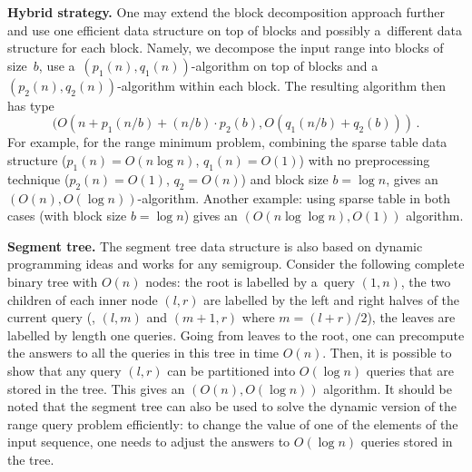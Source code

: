 \textbf{Hybrid strategy.} One may extend the block decomposition
approach further and use one efficient data structure on top of
blocks and possibly a~different data structure for each block.
Namely, we decompose the input range into blocks of size~$b$,
use a~$(p_1(n), q_1(n))$-algorithm on top of blocks and
a~$(p_2(n), q_2(n))$-algorithm within each block. The resulting algorithm then
has type
\[(O(n + p_1(n / b) + (n / b) \cdot p_2(b), O(q_1(n/b) + q_2(b))) \, .\]
For example, for the range minimum problem, combining the sparse table data
structure ($p_1(n)=O(n\log n)$, $q_1(n)=O(1)$) with no preprocessing technique
($p_2(n)=O(1)$, $q_2=O(n)$) and block size $b=\log n$, gives
an~$(O(n), O(\log n))$-algorithm. Another example: using sparse table in both
cases (with block size $b=\log n$) gives an $(O(n\log\log n), O(1))$ algorithm.

%

\textbf{Segment tree.} The segment tree data structure is also based on dynamic
programming ideas and works for any semigroup. Consider the following complete
binary tree with $O(n)$ nodes: the root is labelled by a~query $(1,n)$, the two
children of each inner node $(l,r)$ are labelled by the left and right halves of
the current query (\ie, $(l,m)$ and $(m+1,r)$ where $m=(l+r)/2$), the leaves
are labelled by length one queries. Going from leaves to the root, one can
precompute the answers to all the queries in this tree in time $O(n)$. Then, it
is possible to show that any query $(l,r)$ can be  partitioned into $O(\log n)$
queries that are stored in the tree. This gives an $(O(n), O(\log n))$
algorithm. It should be noted that the segment tree can also be used to solve
the dynamic version of the
%
%
range query
problem efficiently: to change the
value of one of the elements of the input sequence, one needs to adjust the
answers to $O(\log n)$ queries stored in the tree.

